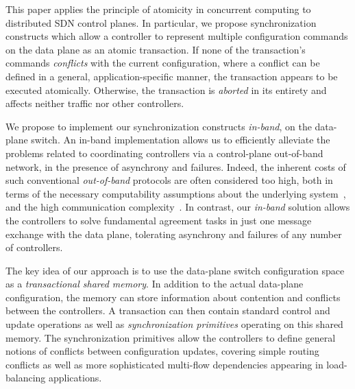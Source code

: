 \documentclass{sig-alternate-2006}
\newcommand{\liron}[1]{\textit{\textcolor{mypurple}{[liron]: #1}}} %
\begin{document}
This paper applies the principle of atomicity in concurrent computing
to distributed SDN control planes.
%
In particular, we propose synchronization constructs which
allow a controller to represent multiple configuration commands on
the data plane as an atomic transaction.
%
If none of the transaction's commands \emph{conflicts}  with the current
configuration, where a conflict can be
defined in a general, application-specific manner, the transaction appears to be executed atomically.
Otherwise, the transaction is \emph{aborted} in its entirety and 
affects neither traffic nor other controllers.

We propose to implement our synchronization constructs \emph{in-band},
on the data-plane switch.
An in-band implementation allows us to efficiently alleviate the problems related to
coordinating controllers via a control-plane
out-of-band network, in the presence of asynchrony and failures.
Indeed, the inherent costs  of such conventional \emph{out-of-band} 
protocols are often considered too high, both in
terms of the necessary computability assumptions about the underlying
system~\cite{FLP85}, and the high communication
complexity~\cite{Lam06}.
In contrast, our \emph{in-band} solution allows the
controllers to solve fundamental agreement tasks in just one message
exchange 
with the data plane, tolerating asynchrony and failures of
any number of controllers.

The key idea of our approach is to use the data-plane switch configuration space
as a \emph{transactional shared memory}.
In addition to the actual data-plane configuration, the memory can store information about  contention and conflicts
between the controllers.
A transaction can then contain standard control and update operations
as well as  \emph{synchronization primitives} operating on this shared
memory.
The synchronization primitives allow the controllers to define
general notions of conflicts between configuration updates,
covering simple routing conflicts 
as well as more sophisticated multi-flow dependencies appearing in load-balancing applications.   
\end{document}
